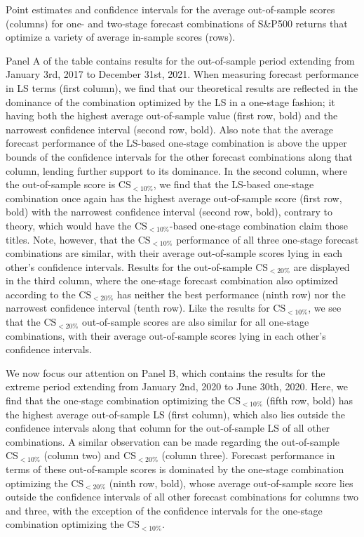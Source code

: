 \documentclass[12pt]{article}
\theoremstyle{definition}
\theoremstyle{remark}
\begin{document}
\begin{table}[ht]
\centering
\resizebox{\linewidth}{!}{}
\caption{Point estimates and confidence intervals for the average out-of-sample scores (columns) for one- and two-stage forecast combinations of S\&P500 returns that optimize a variety of average in-sample scores (rows). }
\label{tbl:emp1}
\end{table}

Panel A of the table contains results for the out-of-sample period extending from January 3rd, 2017 to December 31st, 2021. When measuring forecast performance in LS terms (first column), we find that our theoretical results are reflected in the dominance of the combination optimized by the LS in a one-stage fashion; it having both the highest average out-of-sample value (first row, bold) and the narrowest confidence interval (second row, bold). Also note that the average forecast performance of the LS-based one-stage combination is above the upper bounds of the confidence intervals for the other forecast combinations along that column, lending further support to its dominance. In the second column, where the out-of-sample score is $\mathrm{CS}_{<10\%}$, we find that the LS-based one-stage combination once again has the highest average out-of-sample score (first row, bold) with the narrowest confidence interval (second row, bold), contrary to theory, which would have the $\mathrm{CS}_{<10\%}$-based one-stage combination claim those titles. Note, however, that the $\mathrm{CS}_{<10\%}$ performance of all three one-stage forecast combinations are similar, with their average out-of-sample scores lying in each other's confidence intervals. Results for the out-of-sample $\mathrm{CS}_{<20\%}$ are displayed in the third column, where the one-stage forecast combination also optimized according to the $\mathrm{CS}_{<20\%}$ has neither the best performance (ninth row) nor the narrowest confidence interval (tenth row). Like the results for $\mathrm{CS}_{<10\%}$, we see that the $\mathrm{CS}_{<20\%}$ out-of-sample scores are also similar for all one-stage combinations, with their average out-of-sample scores lying in each other's confidence intervals.

We now focus our attention on Panel B, which contains the results for the extreme period extending from January 2nd, 2020 to June 30th, 2020. Here, we find that the one-stage combination optimizing the $\mathrm{CS}_{<10\%}$ (fifth row, bold) has the highest average out-of-sample LS (first column), which also lies outside the confidence intervals along that column for the out-of-sample LS of all other combinations. A similar observation can be made regarding the out-of-sample $\mathrm{CS}_{<10\%}$ (column two) and $\mathrm{CS}_{<20\%}$ (column three). Forecast performance in terms of these out-of-sample scores is dominated by the one-stage combination optimizing the $\mathrm{CS}_{<20\%}$ (ninth row, bold), whose average out-of-sample score lies outside the confidence intervals of all other forecast combinations for columns two and three, with the exception of the confidence intervals for the one-stage combination optimizing the $\mathrm{CS}_{<10\%}$.
\end{document}

